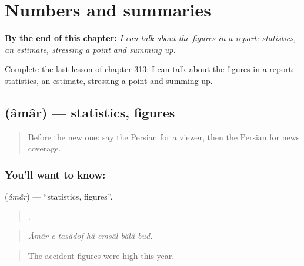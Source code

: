 
\chapter{Numbers and summaries}
\label{ch:fa-numbers-and-summaries}

\begin{chapteropening}
\textbf{By the end of this chapter:} \emph{I can talk about the figures in a report: statistics, an estimate, stressing a point and summing up.}

Complete the last lesson of chapter 313: I can talk about the figures in a report: statistics, an estimate, stressing a point and summing up.
\end{chapteropening}

\section[\texorpdfstring{\fa{آمار} (âmâr)}{آمار (âmâr)}]{ (âmâr) — statistics, figures}

\label{lesson:FA-C313-amar}



\begin{quote}
Before the new one: say the Persian for a viewer, then the Persian for news coverage.
\end{quote}

\subsection*{You'll want to know: }
\textbf{} (\emph{âmâr}) — \textquotedblleft{}statistics, figures\textquotedblright{}.

\begin{quote}
     .
\end{quote}

\begin{quote}
\emph{Âmâr-e tasâdof-hâ emsâl bâlâ bud.}
\end{quote}

\begin{quote}
The accident figures were high this year.
\end{quote}

